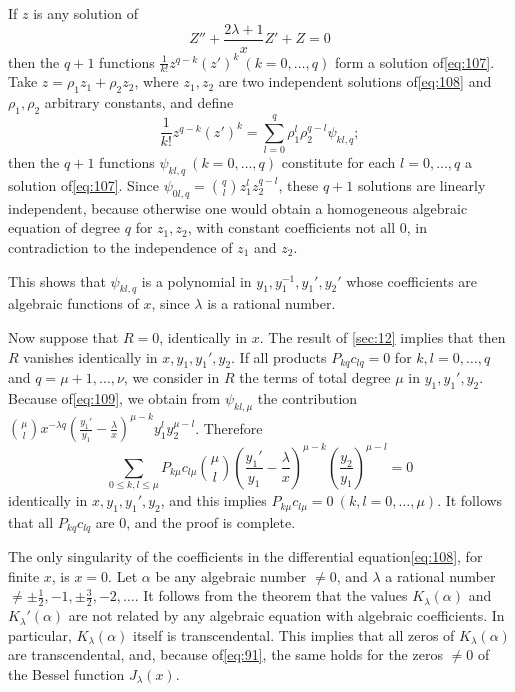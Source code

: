 If $z$ is any solution of
\begin{equation}
Z'' + \frac{2\lambda+1}{x} Z' + Z = 0 \tag{108}\label{eq:108}
\end{equation}
then the $q+1$ functions $\frac{1}{k!} z^{q-k} (z')^k \ (k=0,\dots,q)$ form a solution of\eqref{eq:107}. Take $z = \rho_1 z_1 + \rho_2 z_2$, where $z_1, z_2$ are two independent solutions of\eqref{eq:108} and $\rho_1, \rho_2$ arbitrary constants, and define
\begin{equation}
\frac{1}{k!} z^{q-k} (z')^k = \sum_{l=0}^q \rho_1^l \rho_2^{q-l} \psi_{kl,q}; \tag{109}\label{eq:109}
\end{equation}
then the $q+1$ functions $\psi_{kl,q} \ (k=0,\dots,q)$ constitute for each $l=0,\dots,q$ a solution of\eqref{eq:107}. Since $\psi_{0l,q} = \binom{q}{l} z_1^l z_2^{q-l}$, these $q+1$ solutions are linearly independent, because otherwise one would obtain a homogeneous algebraic equation of degree $q$ for $z_1, z_2$, with constant coefficients not all 0, in contradiction to the independence of $z_1$ and $z_2$.

This shows that $\psi_{kl,q}$ is a polynomial in $y_1, y_1^{-1}, y_1', y_2'$ whose coefficients are algebraic functions of $x$, since $\lambda$ is a rational number.

Now suppose that $R=0$, identically in $x$. The result of \autoref{sec:12} implies that then $R$ vanishes identically in $x, y_1, y_1', y_2$. If all products $P_{kq} c_{lq} = 0$ for $k,l=0,\dots,q$ and $q=\mu+1,\dots,\nu$, we consider in $R$ the terms of total degree $\mu$ in $y_1, y_1', y_2$. Because of\eqref{eq:109}, we obtain from $\psi_{kl,\mu}$ the contribution $\binom{\mu}{l} x^{-\lambda q} \left(\frac{y_1'}{y_1} - \frac{\lambda}{x}\right)^{\mu-k} y_1^l y_2^{\mu-l}$. Therefore
\[\sum_{0 \le k, l \le \mu} P_{k\mu} c_{l\mu} \binom{\mu}{l} \left( \frac{y_1'}{y_1} - \frac{\lambda}{x} \right)^{\mu - k} \left( \frac{y_2}{y_1} \right)^{\mu - l} = 0\]
identically in $x, y_1, y_1', y_2$, and this implies $P_{k\mu} c_{l\mu} = 0 \ (k,l=0,\dots,\mu)$. It follows that all $P_{kq} c_{lq}$ are 0, and the proof is complete.

The only singularity of the coefficients in the differential equation\eqref{eq:108}, for finite $x$, is $x=0$. Let $\alpha$ be any algebraic number $\neq 0$, and $\lambda$ a rational number $\neq \pm \frac{1}{2}, -1, \pm \frac{3}{2}, -2, \dots$. It follows from the theorem that the values $K_\lambda(\alpha)$ and $K_\lambda'(\alpha)$ are not related by any algebraic equation with algebraic coefficients. In particular, $K_\lambda(\alpha)$ itself is transcendental. This implies that all zeros of $K_\lambda(\alpha)$ are transcendental, and, because of\eqref{eq:91}, the same holds for the zeros $\neq 0$ of the Bessel function $J_\lambda(x)$.

